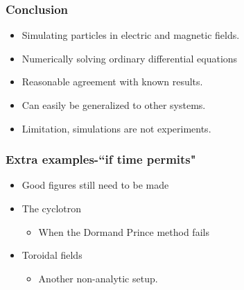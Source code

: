 \documentclass{beamer}
\begin{document}
\begin{frame}
\frametitle{Conclusion }
\begin{itemize}
\item<1-> Simulating particles in electric and magnetic fields.
\item<2-> Numerically solving ordinary differential equations
\item<2-> Reasonable agreement with known results.
\item<2-> Can easily be generalized to other systems.
\item<3-> Limitation, simulations are not experiments.
\end{itemize}
\end{frame}

\begin{frame}
\frametitle{Extra examples-``if time permits" }
\begin{itemize}
\item<1-> [NOTE] Good figures still need to be made
\item<1-> The cyclotron
\begin{itemize}
\item<1-> When the Dormand Prince method fails
\end{itemize}
\item<2-> Toroidal fields
\begin{itemize}
\item<2-> Another non-analytic setup.
\end{itemize}
\end{itemize}
\end{frame}
\end{document}
